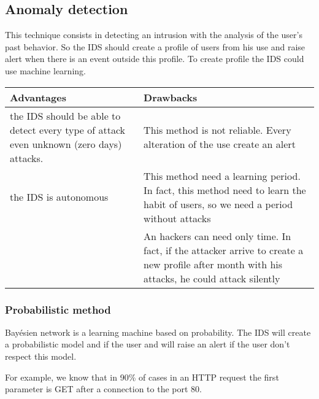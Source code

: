 \subsection{Anomaly detection}

This technique consists in detecting an intrusion with the analysis of the
user's past behavior. So the IDS should create a profile of users from his use
and raise alert when there is an event outside this profile. To create profile
the IDS could use machine learning.
~\\

\begin{tabular}{|p{}|p{}|} \hline
Advantages                                                                           & Drawbacks \\ \hline the IDS should be able to detect every type of
attack even unknown (zero days) attacks.                                             & This method is not reliable. Every
alteration of the use create an alert                                                            \\
  \hline the IDS is autonomous                                                       & This method
need a learning period. In fact, this method need to learn the habit of users,
so we need a period without attacks                                                              \\ \hline & An hackers can need only time. In fact,
if the attacker arrive to create a new profile after month with his attacks, he
could attack silently                                                                            \\ \hline

\end{tabular}


\subsubsection{Probabilistic method}
Bayésien network is a learning machine based on probability. The IDS will create
a probabilistic  model and if the user and will raise an alert if the user don't
respect this model.

For example, we know that in 90\% of cases in an HTTP request the first
parameter is GET after a connection to the port 80.


%









